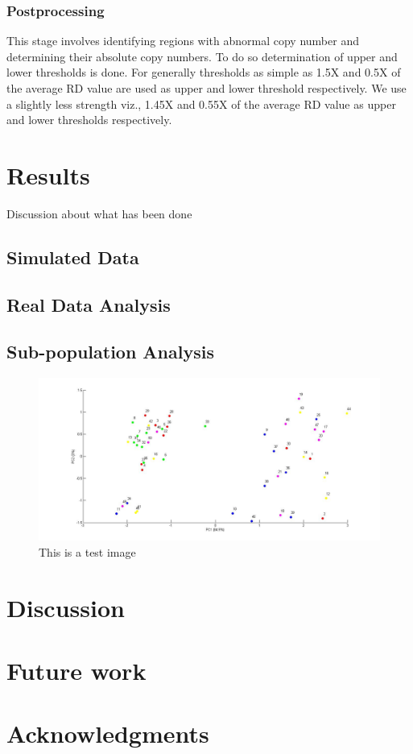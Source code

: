 \documentclass[twocolumn,oneside,conference]
{IEEEtran}
\begin{document}
\subsubsection{Postprocessing}
 This stage involves identifying regions with abnormal copy number and determining their absolute copy numbers. To do so determination of upper and lower thresholds is done. For generally thresholds as simple as 1.5X and 0.5X of the average RD value are used as upper and lower threshold respectively. We use a slightly less strength viz., 1.45X and 0.55X of the average RD value as upper and lower thresholds respectively.   

\section{Results}
Discussion about what has been done
\subsection{Simulated Data}
\subsection{Real Data Analysis}
\subsection{Sub-population Analysis}
\begin{figure}[h]
	\includegraphics[width=\textwidth]{final.jpg}
	\caption{This is a test image}
	\label{fig1: this is test image}
\end{figure}

\section{Discussion}

\section{Future work}

\section*{Acknowledgments}


\printbibliography
\end{document}
